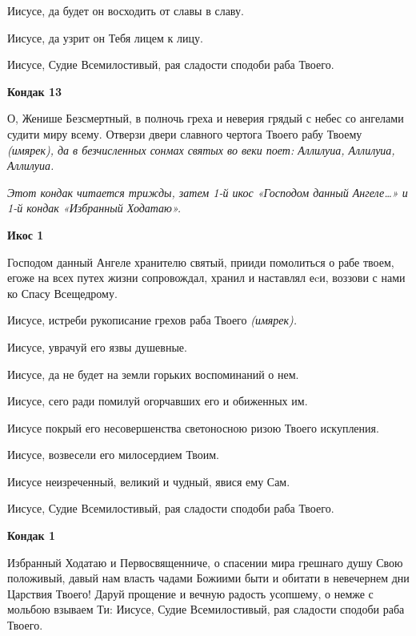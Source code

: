 Иисусе, да будет он восходить от славы в славу. 


Иисусе, да узрит он Тебя лицем к лицу. 


Иисусе, Судие Всемилостивый, рая сладости сподоби раба Твоего.




\bfseries Кондак 13\normalfont{}


О, Женише Безсмертный, в полночь греха и неверия грядый с небес со ангелами судити миру всему. Отверзи двери славного чертога Твоего рабу Твоему \itshape (имярек)\normalfont{}, да в безчисленных сонмах святых во веки поет: Аллилуиа, Аллилуиа, Аллилуиа. 


\itshape Этот кондак читается трижды, затем 1-й икос «Господом данный Ангеле…» и 1-й кондак «Избранный Ходатаю».\normalfont{}




\bfseries Икос 1\normalfont{}


Господом данный Ангеле хранителю святый, прииди помолиться о рабе твоем, егоже на всех путех жизни сопровождал, хранил и наставлял еcи, воззови с нами ко Спасу Всещедрому. 


Иисусе, истреби рукописание грехов раба Твоего \itshape (имярек)\normalfont{}. 


Иисусе, уврачуй его язвы душевные. 


Иисусе, да не будет на земли горьких воспоминаний о нем. 


Иисусе, сего ради помилуй огорчавших его и обиженных им. 


Иисусе покрый его несовершенства светоносною ризою Твоего искупления. 


Иисусе, возвесели его милосердием Твоим. 


Иисусе неизреченный, великий и чудный, явися ему Сам. 


Иисусе, Судие Всемилостивый, рая сладости сподоби раба Твоего.




\bfseries Кондак 1 \normalfont{}


Избранный Ходатаю и Первосвященниче, о спасении мира грешнаго душу Свою положивый, давый нам власть чадами Божиими быти и обитати в невечернем дни Царствия Твоего! Даруй прощение и вечную радость усопшему, о немже с мольбою взываем Ти: Иисусе, Судие Всемилостивый, рая сладости сподоби раба Твоего.


\mychapterending




